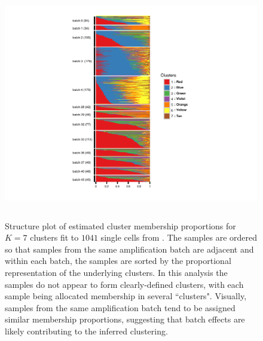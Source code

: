 \begin{figure}[ht]
\centering
\includegraphics[height=4in, width=5.5in]{../plots/jaitin-figures/jaitin-main.pdf}
\caption{Structure plot of estimated cluster membership proportions for $K=7$ clusters fit to $1041$ single cells from \cite{Jaitin2014}. The samples are ordered so that samples from the same amplification batch are adjacent and within each batch, the samples are sorted by the proportional representation of the underlying clusters. In this analysis the samples do not appear to form clearly-defined clusters, with each sample being allocated membership in several ``clusters". Visually, samples from the same amplification batch tend to be assigned similar membership proportions, suggesting that batch effects are likely contributing to the inferred clustering.}
\label{fig:fig3}
\end{figure}



